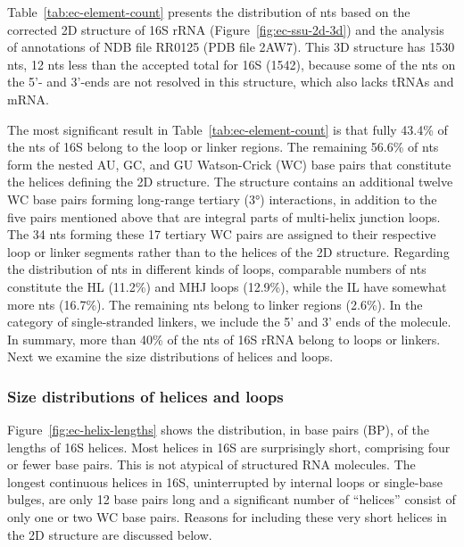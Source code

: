 Table~\ref{tab:ec-element-count} presents the distribution of nts based on the
corrected 2D structure of \EC{} 16S rRNA (Figure~\ref{fig:ec-ssu-2d-3d}) and the
analysis of annotations of NDB file RR0125 (PDB file 2AW7). This 3D structure
has 1530 nts, 12 nts less than the accepted total for \EC{} 16S (1542), because
some of the nts on the 5'- and 3'-ends are not resolved in this structure, which
also lacks tRNAs and mRNA. 

The most significant result in Table~\ref{tab:ec-element-count} is that fully
43.4\% of the nts of \EC{} 16S belong to the loop or linker regions. The
remaining 56.6\% of nts form the nested AU, GC, and GU Watson-Crick (WC) base
pairs that constitute the helices defining the 2D structure. The structure
contains an additional twelve WC base pairs forming long-range tertiary (3°)
interactions, in addition to the five pairs mentioned above that are integral
parts of multi-helix junction loops. The 34 nts forming these 17 tertiary WC
pairs are assigned to their respective loop or linker segments rather than to
the helices of the 2D structure. Regarding the distribution of nts in different
kinds of loops, comparable numbers of nts constitute the HL (11.2\%) and MHJ
loops (12.9\%), while the IL have somewhat more nts (16.7\%). The remaining nts
belong to linker regions (2.6\%). In the category of single-stranded linkers, we
include the 5' and 3' ends of the molecule. In summary, more than 40\% of the
nts of 16S rRNA belong to loops or linkers. Next we examine the size
distributions of helices and loops. 

\subsubsection{Size distributions of helices and loops}

Figure~\ref{fig:ec-helix-lengths} shows the distribution, in base pairs (BP), of
the lengths of 16S helices. Most helices in 16S are surprisingly short,
comprising four or fewer base pairs. This is not atypical of structured RNA
molecules. The longest continuous helices in \EC{} 16S, uninterrupted by
internal loops or single-base bulges, are only 12 base pairs long and a
significant number of ``helices'' consist of only one or two WC base pairs.
Reasons for including these very short helices in the 2D structure are discussed
below. 

